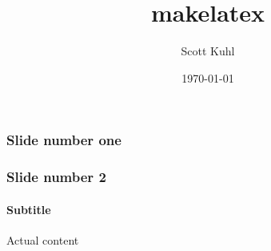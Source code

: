 \documentclass{beamer}
\title{makelatex}
\author{Scott Kuhl}
\date{\today}
\begin{document}
\maketitle

\begin{frame}
  \frametitle{Slide number one}

\end{frame}
\begin{frame}
  \frametitle{Slide number 2}
  \framesubtitle{Subtitle}
  Actual content
\end{frame}
\end{document}
